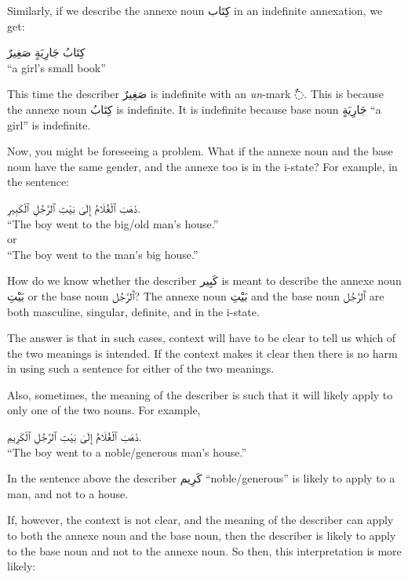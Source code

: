 \documentclass[
  10pt,
]{book}
\begin{document}
Similarly, if we describe the annexe noun \foreignlanguage{arabic}{کِتَاب} in an indefinite annexation, we get:

\foreignlanguage{arabic}{کِتَابُ جَارِيَةٍ صَغِيرٌ}\\
\enquote{a girl's small book}

This time
the describer
\foreignlanguage{arabic}{صَغِيرٌ}
is indefinite with an \emph{un}-mark \foreignlanguage{arabic}{◌ٌ}.
This is because
the annexe noun \foreignlanguage{arabic}{کِتَابُ} is indefinite. It is indefinite because base noun \foreignlanguage{arabic}{جَارِيَةٍ} \enquote{a girl} is indefinite.

Now, you might be foreseeing a problem. What if the annexe noun and the base noun have the same gender, and the annexe too is in the i-state? For example, in the sentence:

\foreignlanguage{arabic}{ذَهَبَ ٱلْغُلَامُ إِلَىٰ بَيْتِ ٱلرَّجُلِ ٱلْکَبِيرِ.}\\
\enquote{The boy went to the big/old man's house.}\\
or\\
\enquote{The boy went to the man's big house.}

How do we know whether the describer \foreignlanguage{arabic}{کَبِير} is meant to describe the annexe noun \foreignlanguage{arabic}{بَيْتِ} or the base noun \foreignlanguage{arabic}{ٱَلرَّجُل}?
The annexe noun \foreignlanguage{arabic}{بَيْتِ} and the base noun \foreignlanguage{arabic}{ٱَلرَّجُل} are both masculine, singular, definite, and in the i-state.

The answer is that in such cases, context will have to be clear to tell us which of the two meanings is intended.
If the context makes it clear then there is no harm in using such a sentence for either of the two meanings.

Also, sometimes, the meaning of the describer is such that it will likely apply to only one of the two nouns. For example,

\foreignlanguage{arabic}{ذَهَبَ ٱلْغُلَامُ إِلَىٰ بَيْتِ ٱلرَّجُلِ ٱلْکَرِيمِ.}\\
\enquote{The boy went to a noble/generous man's house.}

In the sentence above the describer \foreignlanguage{arabic}{کَرِيم} \enquote{noble/generous} is likely to apply to a man, and not to a house.

If, however, the context is not clear, and the meaning of the describer can apply to both the annexe noun and the base noun, then the describer is likely to apply to the base noun and not to the annexe noun. So then, this interpretation is more likely:
\end{document}
